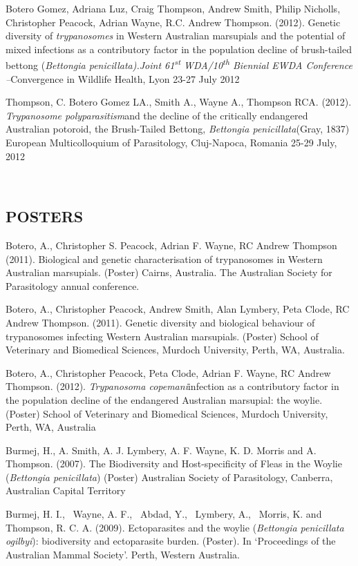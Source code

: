 \documentclass[version=last,
    paper=a4,                               %
    10pt,                                   %
    dvipsnames,
    oneside,                              %
    headings=openany,                       %
    open=any,
    BCOR=7mm,                               %
    DIV=15,     %
]{scrbook}
\begin{document}
Botero Gomez, Adriana Luz, Craig Thompson, Andrew Smith, Philip
Nicholls, Christopher Peacock, Adrian Wayne, R.C. Andrew Thompson.
(2012). Genetic diversity of \emph{trypanosomes} in Western Australian
marsupials and the potential of mixed infections as a contributory
factor in the population decline of brush-tailed bettong
(\emph{Bettongia penicillata).Joint 61\textsuperscript{st}
WDA/10\textsuperscript{th} Biennial EWDA Conference --}Convergence in
Wildlife Health, Lyon 23-27 July 2012

Thompson, C. Botero Gomez LA., Smith A., Wayne A., Thompson RCA. (2012).
\emph{Trypanosome polyparasitism}and the decline of the critically
endangered Australian potoroid, the Brush-Tailed Bettong,
\emph{Bettongia penicillata}(Gray, 1837) European Multicolloquium of
Parasitology, Cluj-Napoca, Romania 25-29 July, 2012

~

\subsection{POSTERS}

Botero, A., Christopher S. Peacock, Adrian F. Wayne, RC Andrew Thompson
(2011). Biological and genetic characterisation of trypanosomes in
Western Australian marsupials. (Poster) Cairns, Australia. The
Australian Society for Parasitology annual conference.

Botero, A., Christopher Peacock, Andrew Smith, Alan Lymbery, Peta Clode,
RC Andrew Thompson. (2011). Genetic diversity and biological behaviour
of trypanosomes infecting Western Australian marsupials. (Poster) School
of Veterinary and Biomedical Sciences, Murdoch University, Perth, WA,
Australia.

Botero, A., Christopher Peacock, Peta Clode, Adrian F. Wayne, RC Andrew
Thompson. (2012). \emph{Trypanosoma copemani}infection as a contributory
factor in the population decline of the endangered Australian marsupial:
the woylie. (Poster) School of Veterinary and Biomedical Sciences,
Murdoch University, Perth, WA, Australia

Burmej, H., A. Smith, A. J. Lymbery, A. F. Wayne, K. D. Morris and A.
Thompson. (2007). The Biodiversity and Host-specificity of Fleas in the
Woylie (\emph{Bettongia penicillata}) (Poster) Australian Society of
Parasitology, Canberra, Australian Capital Territory

Burmej, H. I.,~ Wayne, A. F.,~ Abdad, Y.,~ Lymbery, A.,~ Morris, K. and
Thompson, R. C. A. (2009). Ectoparasites and the woylie (\emph{Bettongia
penicillata ogilbyi}): biodiversity and ectoparasite burden. (Poster).
In `Proceedings of the Australian Mammal Society'. Perth, Western
Australia.
\end{document}
